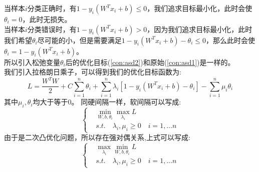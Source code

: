 \documentclass[withoutpreface,bwprint]{cumcmthesis} %
\begin{document}
 	\indent 当样本$i$分类正确时，有$1-y_i\left( W^Tx_i+b \right)\leq 0$，我们追求目标最小化，此时会使$\theta_i=0$，此时无损失。\\
 	\indent 当样本$i$分类错误时，有$1-y_i\left( W^Tx_i+b \right)> 0$，因为我们追求目标最小化，此时我们希望$\theta_i$尽可能的小，但是需要满足$1-y_i\left( W^Tx_i+b \right)-\theta_i \leq 0$，那么此时会使$\theta_i=1-y_i\left( W^Tx_i+b \right)$。\\
 	所以引入松弛变量$\theta_i$后的优化目标(\ref{con:asd2})和原始(\ref{con:asd1})是一样的。\\
 	我们引入拉格朗日乘子，可以得到我们的优化目标函数为:
 	\begin{equation}
 		L=\dfrac{W^TW}{2} +C\sum_{i=1}^{n} \theta_i+\sum_{i=1}^{n}\lambda_i \left[ 1-y_i\left( W^Tx_i+b \right)-\theta_i \right]
 		-\sum_{i=1}^{n} \mu_i \theta_i \label{con:L1}
 	\end{equation}
 	其中$\mu_i,\theta_i$均大于等于0。
 	同硬间隔一样，软间隔可以写成:
 		\begin{equation}
 		\begin{cases}
 			&\mathop{min} \limits_{W,b,\theta_i} \mathop{max} \limits_{\lambda_i} L
 			\\ &s.t. \quad \lambda_i,\mu_i \geq 0 \quad i=1,\ldots n
 		\end{cases} 
 	\end{equation}
 	由于是二次凸优化问题，所以存在强对偶关系,上式可以写成:
 	\begin{equation}
 		\begin{cases}
 			& \mathop{max} \limits_{\lambda_i} \mathop{min} \limits_{W,b,\theta_i} L
 			\\ &s.t. \quad \lambda_i,\mu_i \geq 0 \quad i=1,\ldots n
 		\end{cases} 
 	\end{equation}
 	
 	
 	
\end{document}
